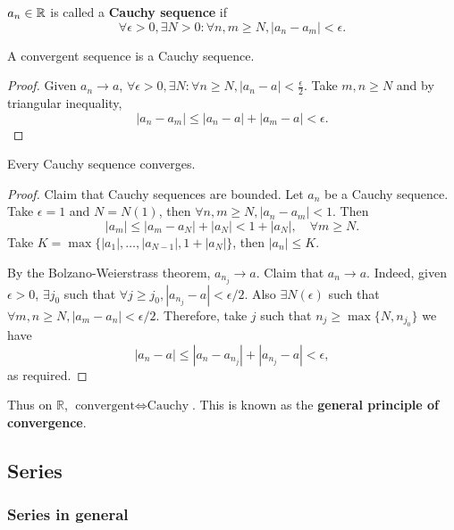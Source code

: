 \begin{definition}
    $a_n\in {\mathbb{R}}$ is called a \textbf{Cauchy sequence} if 
    \[
        \forall \epsilon>0, \exists N>0: \forall n,m\ge N, \left| a_n-a_m \right| <\epsilon.
    \]
\end{definition}

\begin{lemma}\label{lma:convergent -> cauchy}
    A convergent sequence is a Cauchy sequence.
\end{lemma}
\begin{proof}
    Given $ a_n\to a $, $ \forall \epsilon>0, \exists N: \forall n\ge N, |a_n-a|<\frac{\epsilon}{2} $. Take $m,n\ge N$ and by triangular inequality,
    \[
        |a_n-a_m|\le |a_n-a|+|a_m-a|<\epsilon.
    \]
\end{proof}

\begin{theorem}\label{thm:cauchy -> convergent}
    Every Cauchy sequence converges.
\end{theorem}
\begin{proof}
    Claim that Cauchy sequences are bounded. Let $a_n$ be a Cauchy sequence. Take $\epsilon=1$ and $N=N(1)$, then $ \forall n,m\ge N, |a_n-a_m|<1 $. Then
    \[
        |a_m|\le |a_m-a_N|+|a_N|<1+|a_N|, \quad \forall m\ge N.
    \]
    Take $ K= \max\{|a_1|,\dots,|a_{N-1}|, 1+|a_N|\} $, then $|a_n|\le K$.

    By the Bolzano-Weierstrass theorem, $ a_{n_j}\to a $. Claim that $a_n\to a$. Indeed, given $ \epsilon>0 $, $ \exists j_0 $ such that $ \forall j\ge j_0, |a_{n_j}-a|<\epsilon/2 $. Also $ \exists N(\epsilon) $ such that $ \forall m,n\ge N, |a_m-a_n|<\epsilon/2 $. Therefore, take $j$ such that $ n_j\ge \max \{N, n_{j_0}\} $ we have
    \[
        \left| a_n-a \right| \le \left| a_n-a_{n_j} \right| + \left| a_{n_j} -a\right| < \epsilon,
    \]
    as required.
\end{proof}
\begin{note}
    Thus on $ \mathbb{R} $, $ \text{convergent} \Leftrightarrow \text{Cauchy} $. This is known as the \textbf{general principle of convergence}.
\end{note}

\subsection{Series}
\subsubsection*{Series in general}

